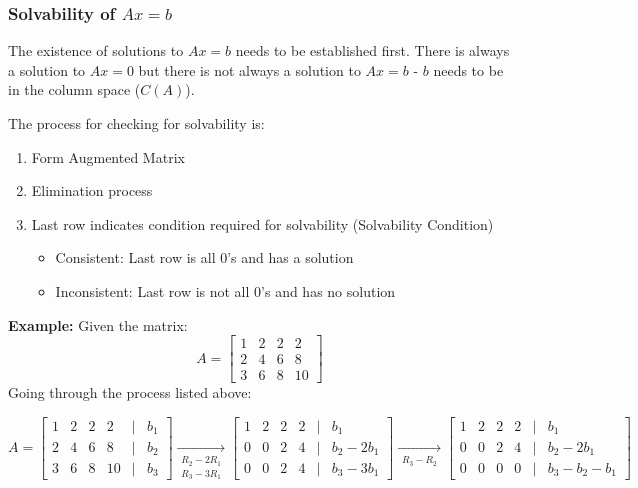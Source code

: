 \documentclass[10pt,a4paper]{article}
\begin{document}
	\subsubsection{Solvability of $Ax=b$}
	The existence of solutions to $Ax=b$ needs to be established first. There is always a solution
	to $Ax=0$ but there is not always a solution to $Ax=b$ - $b$ needs to be in the column space
	($C(A)$). 
	\par 
	\begin{tcolorbox}[breakable,colback=white,colframe=black,width=\dimexpr\textwidth+12mm\relax,enlarge left by=-6mm]
	The process for checking for solvability is:
	\begin{enumerate}
		\item Form Augmented Matrix
		\item Elimination process
		\item Last row indicates condition required for solvability (Solvability Condition)
		\begin{itemize}
			\item Consistent: Last row is all 0's and has a solution
			\item Inconsistent: Last row is not all 0's and has no solution
		\end{itemize}
	\end{enumerate}
	\end{tcolorbox}
	\textbf{Example:} Given the matrix: 
	\begin{equation*}
		A =\begin{bmatrix}
			1 & 2 & 2 & 2 \\
			2 & 4 & 6 & 8 \\
			3 & 6 & 8 & 10
			\end{bmatrix}
	\end{equation*}
	Going through the process listed above: 
	\begin{center}
		$A=
	\begin{bmatrix}
	1 & 2 & 2 & 2 &  |& b_1\\ 
	2 & 4 & 6 &  8&  |& b_2\\ 
	3 & 6 & 8 &  10&|  & b_3
	\end{bmatrix} 
	\xrightarrow[\substack{R_2 - 2R_1 \\ R_3 - 3R_1}]{}
	\begin{bmatrix}
	1 & 2 & 2 & 2 & | & b_1\\ 
	0 & 0 & 2 & 4 & | & b_2-2b_1\\ 
	0 & 0 & 2 & 4 & | & b_3-3b_1
	\end{bmatrix} 
	\xrightarrow[\substack{R_3 - R_2}]{}
	\begin{bmatrix}
	1 & 2 & 2 & 2 & | & b_1\\ 
	0 & 0 & 2 & 4 & | & b_2-2b_1\\ 
	0 & 0 & 0 & 0 & | & b_3-b_2-b_1
	\end{bmatrix} $
	\end{center}
	
\end{document}
